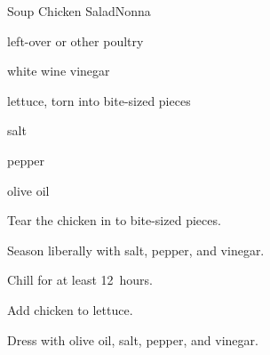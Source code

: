 \begin{recipe}{Soup Chicken Salad}{Nonna}{}

\begin{ingredients}
\item left-over  or other poultry
\item white wine vinegar
\item lettuce, torn into bite-sized pieces
\item salt
\item pepper
\item olive oil
\end{ingredients}

\begin{directions}
\item Tear the chicken in to bite-sized pieces.
\item Season liberally with salt, pepper, and vinegar.
\item Chill for at least 12~hours.
\item Add chicken to lettuce.
\item Dress with olive oil, salt, pepper, and vinegar.
\end{directions}

\end{recipe}
